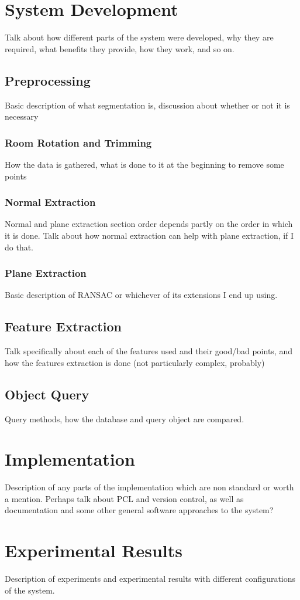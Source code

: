 \documentclass[11pt,a4paper]{report}
\begin{document}
\chapter{System Development}
Talk about how different parts of the system were developed, why they are
required, what benefits they provide, how they work, and so on.
\section{Preprocessing}
Basic description of what segmentation is, discussion about whether or not it is
necessary
\subsection{Room Rotation and Trimming}
How the data is gathered, what is done to it at the beginning to remove some points
\subsection{Normal Extraction}
Normal and plane extraction section order depends partly on the order in which
it is done. Talk about how normal extraction can help with plane extraction, if
I do that.
\subsection{Plane Extraction}
Basic description of RANSAC or whichever of its extensions I end up using.
\section{Feature Extraction}
Talk specifically about each of the features used and their good/bad points, and
how the features extraction is done (not particularly complex, probably)
\section{Object Query}
Query methods, how the database and query object are compared.

\chapter{Implementation}
Description of any parts of the implementation which are non standard or worth a
mention. Perhaps talk about PCL and version control, as well as documentation
and some other general software approaches to the system?
\chapter{Experimental Results}
Description of experiments and experimental results with different
configurations of the system.
\end{document}
